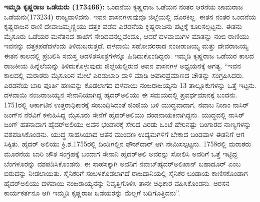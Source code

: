\textbf{ಇಮ್ಮಡಿ ಕೃಷ್ಣರಾಜ ಒಡೆಯರು (1734\general{\enginline{-}}66): } ಒಂದನೆಯ ಕೃಷ್ಣರಾಜ ಒಡೆಯನ ನಂತರ ಆರನೆಯ ಚಾಮರಾಜ ಒಡೆಯನು(1732\enginline{-}34) ರಾಜ್ಯವಾಳಿದನು. ಇವನ ಶಾಸನಗಳಾವುವೂ ಜಿಲ್ಲೆಯಲ್ಲಿ ದೊರಕಿಲ್ಲ. ಈತನ ನಂತರ ಒಂದನೆಯ ಕೃಷ್ಣರಾಜನ ರಾಣಿ ದೇವಾಜಮ್ಮಣ್ಣಿಯು ದತ್ತಕ ಪಡೆದ ಎರಡನೆಯ ಕೃಷ್ಣರಾಜನು ಪಟ್ಟಕ್ಕೆ ಕೂರಿಸಲ್ಪಟ್ಟನು. ಈತನು ಮೈಸೂರು ಒಡೆಯರ ಮನೆತನದ ಶಾಖೆಗೆ ಸೇರಿದವನಲ್ಲವೆಂದೂ, ಆದರೆ ದಳವಾಯಿಗಳ ಮಾತನ್ನು ನಂಬಿ ರಾಣಿಯು ಇವನನ್ನು ದತ್ತಕಪಡೆದಳೆಂದು ತಿಳಿದುಬರುತ್ತದೆ. ದಳವಾಯಿ ಸಹೋದರರಾದ ನಂಜರಾಜಯ್ಯ ಮತ್ತು ದೇವರಾಜಯ್ಯ ಈತನ ಕಾಲದಲ್ಲಿ ಪ್ರಬಲಿಸಿ ಸಮಸ್ತ ಆಡಳಿತಸೂತ್ರಗಳನ್ನೂ ಹಿಡಿದುಕೊಂಡಿದ್ದರು. ಇಮ್ಮಡಿ ಕೃಷ್ಣರಾಜ ಒಡೆಯರ ಕಾಲದ ರಾಜಕೀಯ ಹಿನ್ನೆಲೆಯನ್ನು ತಿಳಿದುಕೊಳ್ಳುವುದು ಜಿಲ್ಲೆಯಲ್ಲಿರುವ ಅವನ ಶಾಸನಗಳ ಅಧ್ಯಯನಕ್ಕೆ ಅಗತ್ಯ. “ಇವನ ಕಾಲದಲ್ಲಿ ಮರಾಠರು ಮೈಸೂರಿನ ಮೇಲೆ ಎರಡುಬಾರಿ ದಾಳಿ ಮಾಡಿ ಅಪಾರಪ್ರಮಾಣದ ಚೌತನ್ನು ಸಂಗ್ರಹಿಸಿದರು. ಎರಡನೆಯ ಬಾರಿ ಪೂರ್ತಿ ಹಣವನ್ನು ಕೊಡಲಾಗದ ದಳವಾಯಿ ನಂಜರಾಜಯ್ಯನು 13 ತಾಲ್ಲೂಕುಗಳನ್ನು ಒತ್ತೆ ಇಟ್ಟನು. ದಳವಾಯಿ ನಂಜರಾಜಯ್ಯನ ಸೇನಾನಿಯಾಗಿದ್ದ ಹೈದರ್​ಅಲಿಯು ಈ ಸಮಯದಲ್ಲಿ ಪ್ರವರ್ಧಮಾನಕ್ಕೆ ಬಂದನು. 1751ರಲ್ಲಿ ಆರ್ಕಾಟಿನ ಉತ್ತರಾಧಿಕಾರಕ್ಕೆ ಸಂಬಂಧಿಸಿದಂತೆ ಜಿಂಜಿಯ ಬಳಿ ಯುದ್ಧವಾದಾಗ, ನವಾಬ ನಿಜಾಂ ನಾಸಿರ್​ಜಂಗ್​ನ ನೆರವಿಗೆ ಕಳುಹಿಸಿದ್ದ ಮೈಸೂರು ಸೇನೆಗೆ ಹೈದರ್​ಅಲಿಯು ದಂಡನಾಯಕನಾಗಿದ್ದನು. ಯುದ್ಧದಲ್ಲಿ ನಾಸಿರ್​ಜಂಗ್​ ಹತನಾದಾಗ ಹೈದರ್​ಅಲಿಯು ಅವನ ಭಂಡಾರಕ್ಕೆ ಸೇರಿದ ಎರಡು ಒಂಟೆ ಹೇರಿನಷ್ಟು ಬಂಗಾರದ ನಾಣ್ಯಗಳನ್ನು ವಶಪಡಿಸಿಕೊಂಡನು. ಯುದ್ಧ ಸಾಹಸಿಯಾದ ಆತನ ಮುಂದಣ ಉದ್ಯಮಗಳಿಗೆ ಬೇಕಾದ ಬಂಡವಾಳ ಈತನಿಗೆ ಆಗ ಸಿಕ್ಕಿತು. ಹೈದರ್​ ಅಲಿಯು ಕ್ರಿ.ಶ.1755ರಲ್ಲಿ ದಿಂಡಿಗಲ್ಲಿನ ಫೌಜ್​ದಾರ್​ ಆಗಿ ನೇಮಿಸಲ್ಪಟ್ಟನು. 1758ರಲ್ಲಿ ಮರಾಠರು ಮೂರನೆಯ ಬಾರಿ ಚೌತ ಸಂಗ್ರಹಕ್ಕೆ ಬಂದಾಗ ಸೇನಾನಿ ಹೈದರ್​ಅಲಿ ಅವರನ್ನು ಸೋಲಿಸಿ ಅವರಿಗೆ ಒತ್ತೆ ಇಟ್ಟಿದ್ದ ಬೆಂಗಳೂರನ್ನು ವಶಪಡಿಸಿಕೊಂಡನು. ಈ ಸಾಹಸಕ್ಕಾಗಿ ಅವನಿಗೆ ನವಾಬ್​ ಹೈದರ್​ಅಲಿಖಾನ್​ ಬಹಾದೂರ್​ ಎಂಬ ಬಿರುದನ್ನು ನೀಡಲಾಯಿತು. ಸೈನಿಕರಿಗೆ ಸಂಬಳಕೊಡಲಾಗದೆ ರಾಜಧಾನಿಯಲ್ಲಿ ಸೈನಿಕರ ಬಂಡಾಯ ಕಾಣಿಸಕೊಂಡಾಗ ಹೈದರ್​ಅಲಿಯು ದಳವಾಯಿ ನಂಜರಾಯ್ಯನನ್ನು ನಿವೃತ್ತಿಗೊಳಿಸಿ ತಾನೇ ಅಧಿಕಾರ ವಹಿಸಿಕೊಂಡನು. ಅರಸನ ಕಾರ್ಯಕರ್ತನೂ ಆಗಿ ಇಮ್ಮಡಿ ಕೃಷ್ಣರಾಜ ಒಡೆಯರನ್ನು ಮೆಲ್ಲಗೆ ಬದಿಗೊತ್ತಿದನು”.


